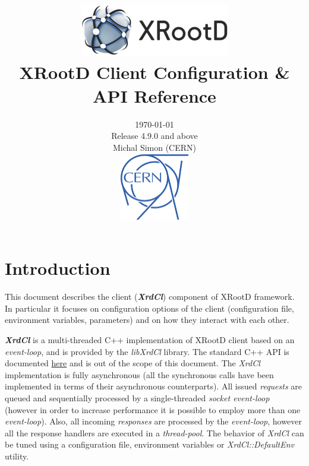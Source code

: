 \documentclass{article}
\title{\includegraphics{xrootd-logo.png} \\ \huge \textbf{XRootD Client Configuration \& API Reference}}
\author{\small \today \\ \small Release 4.9.0 and above \\ \small Michal Simon (CERN) \\ \includegraphics[width=3cm, height=3cm]{cern-logo.png}}
\date{}
\begin{document}
\maketitle
\newpage



\tableofcontents

\newpage

\section{Introduction}
    
    This document describes the client (\textit{\textbf{XrdCl}}) component of XRootD framework. In particular it focuses
    on configuration options of the client (configuration file, environment variables, parameters) and on how they
    interact with each other.
    
    \textit{\textbf{XrdCl}} is a multi-threaded C++ implementation of XRootD client based on an \textit{event-loop}, and is provided 
    by the \textit{libXrdCl} library. The standard C++ API is documented \href{http://xrootd.org/doc/doxygen/current/html/annotated.html}
	{here} and is out of the scope of this document. The \textit{XrdCl} implementation is fully asynchronous (all the synchronous 
	calls have been implemented in terms of their asynchronous counterparts). All issued \textit{requests} are queued and sequentially 
	processed by a single-threaded \textit{socket event-loop} (however in order to increase performance it is possible to employ more 
	than one \textit{event-loop}). Also, all incoming \textit{responses} are processed by the \textit{event-loop}, however all the 
	response handlers are executed in a \textit{thread-pool}. The behavior of \textit{XrdCl} can be tuned using a configuration file,
	environment variables or \textit{XrdCl::DefaultEnv} utility. 
	
\end{document}
